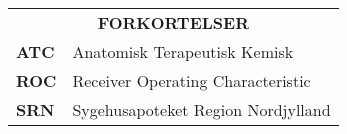 \begin{table}[H]
\label{table:forkortelser}
\begin{tabular}{p{4.5cm} p{9.8cm}}
\multicolumn{2}{c}{\cellcolor[HTML]{C0C0C0}\textbf{ FORKORTELSER}} \vspace{0.2cm} \\
\textbf{ATC} &  Anatomisk Terapeutisk Kemisk \vspace{0.2cm} \\
\textbf{ROC} & Receiver Operating Characteristic \vspace{0.2cm} \\
\textbf{SRN} & Sygehusapoteket Region Nordjylland \vspace{0.2cm} \\
\end{tabular}
\end{table}
\vspace{-0.2cm}


